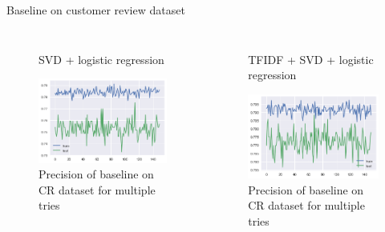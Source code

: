 \documentclass[xcolor={table}]{beamer}
\begin{document}
\begin{frame}{Baseline on customer review dataset}
    \begin{columns}
                   \begin{figure}[H]
                    \centering
                    \caption*{SVD + logistic regression}
                    \includegraphics[height=0.4\textheight]{images/CRDataset.png}
                    \caption{Precision of baseline on CR dataset for multiple tries}
                \end{figure}

                \begin{figure}[H]
                    \centering
                    \caption*{TFIDF + SVD + logistic regression}
                    \includegraphics[height=0.4\textheight]{images/CRDataset_tfidf.png}
                    \caption{Precision of baseline on CR dataset for multiple tries}
                \end{figure}
    \end{columns}
                
\end{frame} 
\end{document}
